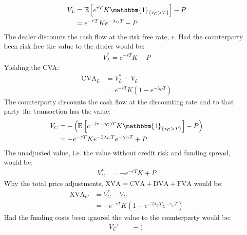 \documentclass[10pt,a4paper]{article}
\begin{document}
\begin{description}
            \begin{align}
                V_{L} &= \mathbb{E}\left[
                    e^{rT}K \mathbbm{1}_{\{\tau_C > T\}}
                \right] - P \\
                &= e^{-rT} K e^{-\lambda_{C}T} - P
            \end{align}
            The dealer discounts the cash flow at the risk free rate, $r$. Had the counterparty been risk free the value to the dealer would be:
                \begin{align}
                    V_{L}^{\ast} = e^{-rT}K - P
                \end{align}
            Yielding the CVA:
                \begin{align}
                    \text{CVA}_{L} 
                        &= V^{\ast}_{L} - V_{L} \\
                        & = e^{-rT}K(1-e^{-\lambda_{C}T})
                \end{align}
            The counterparty discounts the cash flow at the discounting rate and to that party the transaction has the value:
                \begin{align}
                    V_{C} 
                    &= - \left(
                        \mathbb{E}\left[
                            e^{-(r+s_{C})T}K \mathbbm{1}_{\{\tau_{C}>T\}}
                        \right] - P
                    \right) \\
                    &= - e^{-rT}Ke^{-2\lambda_{C}T} e^{-\gamma_{C}T} + P
                \end{align}
            The unadjusted value, i.e. the value without credit risk and funding spread, would be: 
                \begin{align}
                    V_{C}^{\ast} 
                    &= -e^{-rT}K + P
                \end{align}
            Why the total price adjustments, $\text{XVA} = \text{CVA} + \text{DVA} + \text{FVA}$ would be:
                \begin{align}
                    \text{XVA}_{C}
                    &= V_{C}^{\ast} - V_{C} \\
                    &= -e^{-rT}K(1 - e^{-2\lambda_{C}T}e^{-\gamma_{C}T})
                \end{align}
            Had the funding costs been ignored the value to the counterparty would be:
                \begin{align}
                    V_{C}' 
                    &= - \left(

\end{align}
\end{description}
\end{document}
